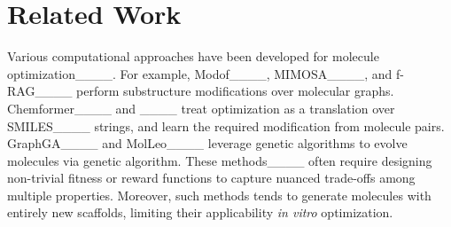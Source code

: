 \section{Related Work}
\label{sec:rel}
%
Various computational approaches have been developed for molecule optimization____.
%
%
For example, Modof____, MIMOSA____,
and f-RAG____ 
perform substructure modifications over molecular graphs.
%
Chemformer____ and \PMol____ treat optimization as a translation over SMILES____ strings, 
and learn the required modification from molecule pairs.
%
GraphGA____ and MolLeo____ leverage 
genetic algorithms
to evolve molecules via genetic algorithm. %
%
These methods____ often require designing non-trivial fitness or reward functions
to capture nuanced trade-offs among multiple properties. 
%
%
Moreover, such methods 
tends to generate
molecules with entirely new scaffolds, 
limiting their applicability \emph{in vitro} optimization.


%
%
%
%
%

